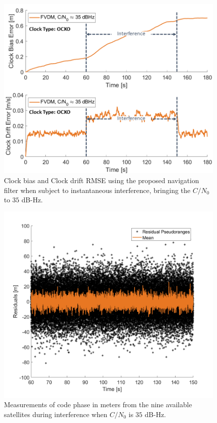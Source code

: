 \documentclass[12pt]{report}
\begin{document}
\begin{figure}[!ht]
  \centering
  \includegraphics[width=0.75\linewidth]{Figures/Results/trajectoryfigure/Slide24.PNG}
  \caption{Clock bias and Clock drift RMSE using the proposed navigation filter when subject to instantaneous interference, bringing the \(C/N_0\) to \(35\) dB-Hz.}\label{fig:Clk35}
\end{figure}

\begin{figure}[!ht]
  \centering
  \includegraphics[width=0.75\linewidth]{Figures/Results/Scenario1/Case35/codephase.png}
  \caption{Measurements of code phase in meters from the nine available satellites during interference when \(C/N_0\) is \(35\) dB-Hz.}\label{fig:codephase35}
\end{figure}
\end{document}
